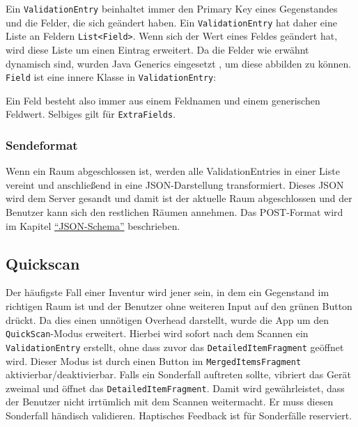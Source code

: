Ein \texttt{ValidationEntry} beinhaltet immer den Primary Key eines
Gegenstandes und die Felder, die sich geändert haben. Ein
\texttt{ValidationEntry} hat daher eine Liste an Feldern
\texttt{List\textless{}Field\textgreater{}}. Wenn sich der Wert eines
Feldes geändert hat, wird diese Liste um einen Eintrag erweitert. Da die
Felder wie erwähnt dynamisch sind, wurden Java Generics eingesetzt
\cite{java-generics}, um diese abbilden zu können. \texttt{Field} ist
eine innere Klasse in \texttt{ValidationEntry}:

\begin{Shaded}
\begin{Highlighting}[]
   
     
\end{Highlighting}
\end{Shaded}

Ein Feld besteht also immer aus einem Feldnamen und einem generischen
Feldwert. Selbiges gilt für \texttt{ExtraFields}.

\hypertarget{sendeformat}{%
\subsubsection{Sendeformat}\label{sendeformat}}

Wenn ein Raum abgeschlossen ist, werden alle ValidationEntries in einer
Liste vereint und anschließend in eine JSON-Darstellung transformiert.
Dieses JSON wird dem Server gesandt und damit ist der aktuelle Raum
abgeschlossen und der Benutzer kann sich den restlichen Räumen annehmen.
Das POST-Format wird im Kapitel
\protect\hyperlink{json-schema}{``JSON-Schema''} beschrieben.

\hypertarget{quickscan}{%
\subsection{Quickscan}\label{quickscan}}

Der häufigste Fall einer Inventur wird jener sein, in dem ein Gegenstand
im richtigen Raum ist und der Benutzer ohne weiteren Input auf den
grünen Button drückt. Da dies einen unnötigen Overhead darstellt, wurde
die App um den \texttt{QuickScan}-Modus erweitert. Hierbei wird sofort
nach dem Scannen ein \texttt{ValidationEntry} erstellt, ohne dass zuvor
das \texttt{DetailedItemFragment} geöffnet wird. Dieser Modus ist durch
einen Button im \texttt{MergedItemsFragment} aktivierbar/deaktivierbar.
Falls ein Sonderfall auftreten sollte, vibriert das Gerät zweimal und
öffnet das \texttt{DetailedItemFragment}. Damit wird gewährleistet, dass
der Benutzer nicht irrtümlich mit dem Scannen weitermacht. Er muss
diesen Sonderfall händisch validieren. Haptisches Feedback ist für
Sonderfälle reserviert.

